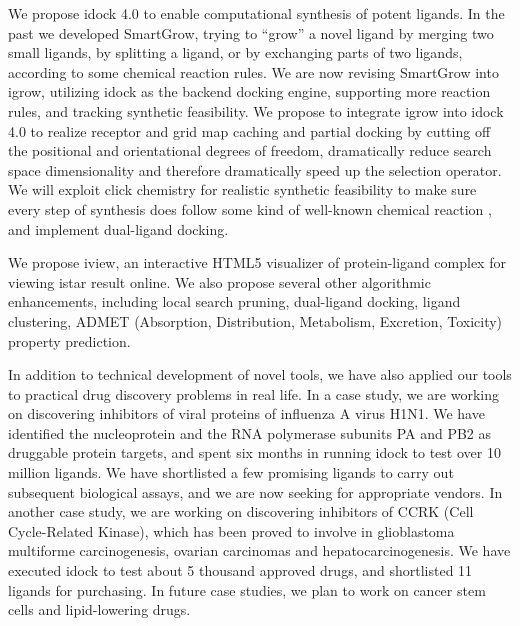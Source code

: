 We propose idock 4.0 to enable computational synthesis of potent ligands. In the past we developed SmartGrow, trying to ``grow'' a novel ligand by merging two small ligands, by splitting a ligand, or by exchanging parts of two ligands, according to some chemical reaction rules. We are now revising SmartGrow into igrow, utilizing idock as the backend docking engine, supporting more reaction rules, and tracking synthetic feasibility. We propose to integrate igrow into idock 4.0 to realize receptor and grid map caching and partial docking by cutting off the positional and orientational degrees of freedom, dramatically reduce search space dimensionality and therefore dramatically speed up the selection operator. We will exploit click chemistry for realistic synthetic feasibility to make sure every step of synthesis does follow some kind of well-known chemical reaction \citep{1051}, and implement dual-ligand docking.

We propose iview, an interactive HTML5 visualizer of protein-ligand complex for viewing istar result online. We also propose several other algorithmic enhancements, including local search pruning, dual-ligand docking, ligand clustering, ADMET (Absorption, Distribution, Metabolism, Excretion, Toxicity) property prediction. 

In addition to technical development of novel tools, we have also applied our tools to practical drug discovery problems in real life. In a case study, we are working on discovering inhibitors of viral proteins of influenza A virus H1N1. We have identified the nucleoprotein and the RNA polymerase subunits PA and PB2 as druggable protein targets, and spent six months in running idock to test over 10 million ligands. We have shortlisted a few promising ligands to carry out subsequent biological assays, and we are now seeking for appropriate vendors. In another case study, we are working on discovering inhibitors of CCRK (Cell Cycle-Related Kinase), which has been proved to involve in glioblastoma multiforme carcinogenesis, ovarian carcinomas and hepatocarcinogenesis. We have executed idock to test about 5 thousand approved drugs, and shortlisted 11 ligands for purchasing. In future case studies, we plan to work on cancer stem cells and lipid-lowering drugs.

\chapterend
